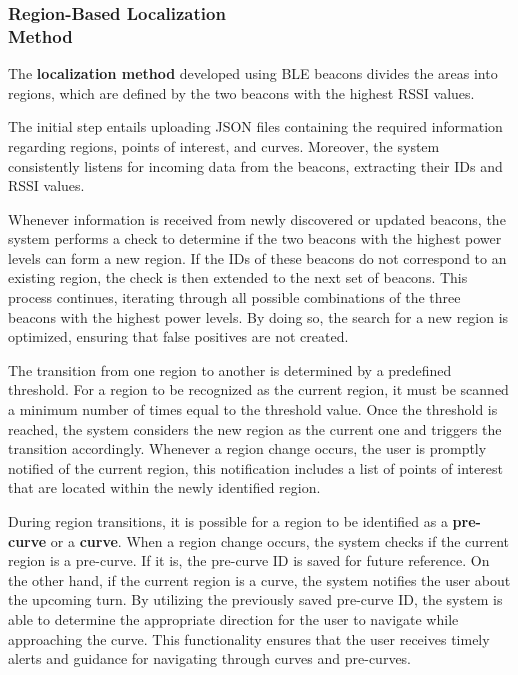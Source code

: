 \subsubsection{Region-Based Localization\\ Method}
The \textbf{localization method} developed using BLE beacons divides the areas into regions, which are defined by the two beacons with the highest RSSI values.

The initial step entails uploading JSON files containing the required information regarding regions, points of interest, and curves. Moreover, the system consistently listens for incoming data from the beacons, extracting their IDs and RSSI values.

Whenever information is received from newly discovered or updated beacons, the system performs a check to determine if the two beacons with the highest power levels can form a new region. If the IDs of these beacons do not correspond to an existing region, the check is then extended to the next set of beacons. This process continues, iterating through all possible combinations of the three beacons with the highest power levels. By doing so, the search for a new region is optimized, ensuring that false positives are not created.

The transition from one region to another is determined by a predefined threshold. For a region to be recognized as the current region, it must be scanned a minimum number of times equal to the threshold value. Once the threshold is reached, the system considers the new region as the current one and triggers the transition accordingly. Whenever a region change occurs, the user is promptly notified of the current region, this notification includes a list of points of interest that are located within the newly identified region.

During region transitions, it is possible for a region to be identified as a \textbf{pre-curve} or a \textbf{curve}. When a region change occurs, the system checks if the current region is a pre-curve. If it is, the pre-curve ID is saved for future reference. On the other hand, if the current region is a curve, the system notifies the user about the upcoming turn. By utilizing the previously saved pre-curve ID, the system is able to determine the appropriate direction for the user to navigate while approaching the curve. This functionality ensures that the user receives timely alerts and guidance for navigating through curves and pre-curves.

